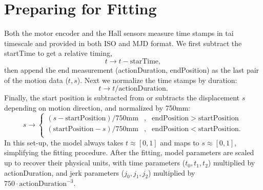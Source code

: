 \documentclass[OPS,lsstdraft,authoryear,toc]{lsstdoc}
\newcommand{\eq}[1]{\begin{equation}#1\end{equation}}
\newcommand{\ead}[1]{\begin{aligned}#1\end{aligned}}
\begin{document}
\section{Preparing for Fitting}
Both the motor encoder and the Hall sensors measure time stamps in tai timescale and provided in both ISO and MJD format.  We first subtract the startTime to get a relative timing,
\begin{equation}
    t \to t - \mathrm{starTime},
\end{equation}
then append the end measurement (actionDuration, endPosition) as the last pair of the motion data ($t, s$). Next we normalize the time stamps by duration:
\eq{
    t \to t/\mathrm{actionDuration}.
}
Finally, the start position is subtracted from or subtracts the displacement $s$ depending on motion direction, and normalized by 750mm:
\eq{
	s \to
	\left\{ \ead{
			(s - \mathrm{startPosition})/750 \mathrm{mm} &, & \mathrm{endPosition} > \mathrm{startPosition}  \\
			(\mathrm{startPosition} - s)/750 \mathrm{mm} &, & \mathrm{endPosition} < \mathrm{startPosition}.  \\
}
\right.
}
In this set-up, the model always takes $t \approx [0,1]$ and maps to $s \approx [0,1]$, simplifying the fitting procedure. After the fitting, model parameters are scaled up to recover their physical units, with time parameters ($t_0, t_1, t_2$) multiplied by actionDuration, and jerk parameters ($j_0, j_1, j_2$) multiplied by $750 \cdot \mathrm{actionDuration}^{-3}$.
\end{document}
